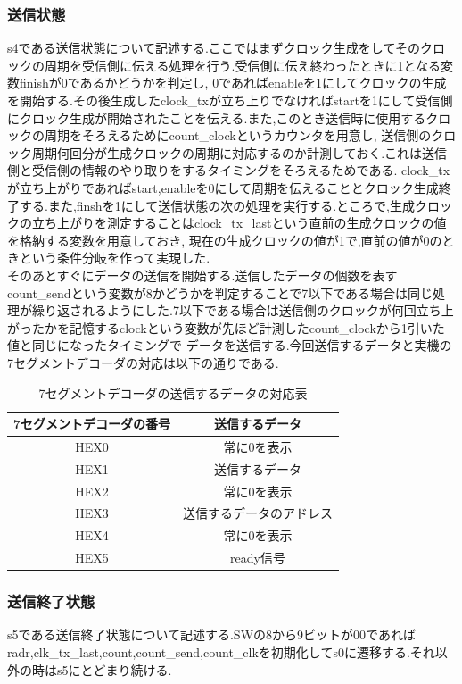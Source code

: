 \documentclass[dvipdfmx]{jarticle}
\begin{document}
\subsubsection{送信状態}
s4である送信状態について記述する.ここではまずクロック生成をしてそのクロックの周期を受信側に伝える処理を行う.受信側に伝え終わったときに1となる変数finishが0であるかどうかを判定し,
0であればenableを1にしてクロックの生成を開始する.その後生成したclock\_txが立ち上りでなければstartを1にして受信側にクロック生成が開始されたことを伝える.また,このとき送信時に使用するクロックの周期をそろえるためにcount\_clockというカウンタを用意し,
送信側のクロック周期何回分が生成クロックの周期に対応するのか計測しておく.これは送信側と受信側の情報のやり取りをするタイミングをそろえるためである.
clock\_txが立ち上がりであればstart,enableを0にして周期を伝えることとクロック生成終了する.また,finshを1にして送信状態の次の処理を実行する.ところで,生成クロックの立ち上がりを測定することはclock\_tx\_lastという直前の生成クロックの値を格納する変数を用意しておき,
現在の生成クロックの値が1で,直前の値が0のときという条件分岐を作って実現した.
\\そのあとすぐにデータの送信を開始する.送信したデータの個数を表すcount\_sendという変数が8かどうかを判定することで7以下である場合は同じ処理が繰り返されるようにした.7以下である場合は送信側のクロックが何回立ち上がったかを記憶するclockという変数が先ほど計測したcount\_clockから1引いた値と同じになったタイミングで
データを送信する.今回送信するデータと実機の7セグメントデコーダの対応は以下の通りである.
\clearpage
\begin{table}[h]
  \centering
  \begin{tabular}{|c|c|}
    \hline
    7セグメントデコーダの番号 & 送信するデータ\\
    \hline\hline
    HEX0 & 常に0を表示\\\hline
    HEX1 & 送信するデータ\\\hline
    HEX2 & 常に0を表示\\\hline
    HEX3 & 送信するデータのアドレス\\\hline
    HEX4 & 常に0を表示\\\hline
    HEX5 & ready信号 \\\hline
  \end{tabular}
  \caption{7セグメントデコーダの送信するデータの対応表}
\end{table}
\subsubsection{送信終了状態}
s5である送信終了状態について記述する.SWの8から9ビットが00であればradr,clk\_tx\_last,count,count\_send,count\_clkを初期化してs0に遷移する.それ以外の時はs5にとどまり続ける.
\end{document}
